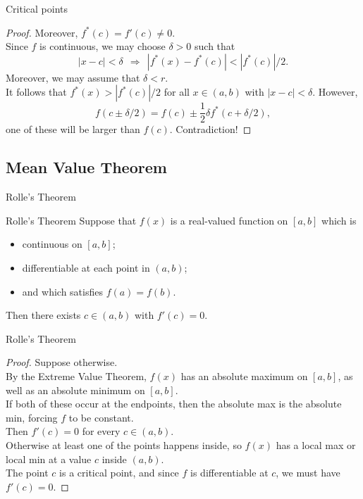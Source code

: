 \documentclass{beamer}
\begin{document}
\begin{frame}{Critical points}
\begin{proof}
Moreover, $f^*(c) = f'(c)\neq 0$.\\
\pause
Since $f$ is continuous, we may choose $\delta > 0$ such that
$$|x-c| < \delta\ \ \Rightarrow\ \ |f^*(x) - f^*(c)| < |f^*(c)|/2.$$
\pause
Moreover, we may assume that $\delta < r$.\\
\pause
It follows that $f^*(x) > |f^*(c)|/2$ for all $x\in (a,b)$ with $|x-c|<\delta$.
\pause
However,
$$f(c\pm \delta/2) = f(c) \pm \frac{1}{2}\delta f^*(c+\delta/2),$$
one of these will be larger than $f(c)$.  \pause Contradiction!
\end{proof}
\end{frame}

\subsection{Mean Value Theorem}

\begin{frame}{Rolle's Theorem}
\begin{thm}{Rolle's Theorem}
Suppose that $f(x)$ is a real-valued function on $[a,b]$ which is
\begin{itemize}
\pause
\item continuous on $[a,b]$;
\pause
\item differentiable at each point in $(a,b)$;
\pause
\item and which satisfies $f(a) = f(b)$.
\end{itemize}
\pause
Then there exists $c\in (a,b)$ with $f'(c) = 0$.
\end{thm}
\end{frame}

\begin{frame}{Rolle's Theorem}
\begin{proof}
Suppose otherwise.\\
\pause
By the Extreme Value Theorem, $f(x)$ has an absolute maximum on $[a,b]$, as well as an absolute minimum on $[a,b]$.\\
\pause
If both of these occur at the endpoints, then the absolute max is the absolute min, forcing $f$ to be constant.\\
\pause
Then $f'(c)=0$ for every $c\in (a,b)$.\\
\pause
Otherwise at least one of the points happens inside, so $f(x)$ has a local max or local min at a value $c$ inside $(a,b)$.\\
\pause
The point $c$ is a critical point, and since $f$ is differentiable at $c$, we must have $f'(c)=0$.
\end{proof}
\end{frame}
\end{document}
